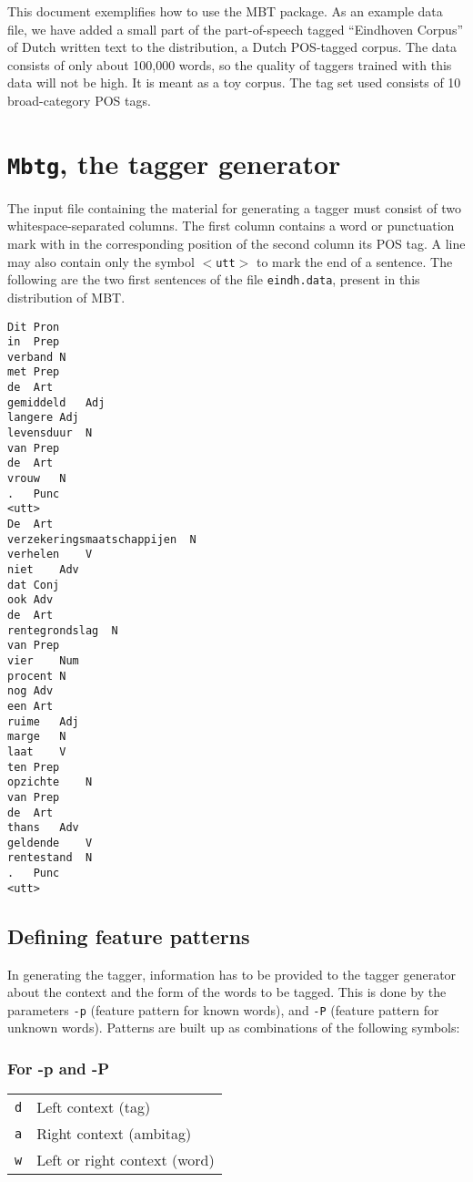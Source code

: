 \documentclass{report}
\begin{document}
This document exemplifies how to use the MBT package. As an example
data file, we have added a small part of the part-of-speech tagged
``Eindhoven Corpus'' of Dutch written text \cite{Uitdenboogaard75} to
the distribution, a Dutch POS-tagged corpus. The data consists of only
about 100,000 words, so the quality of taggers trained with this data
will not be high. It is meant as a toy corpus. The tag set used
consists of 10 broad-category POS tags.

\section{{\tt Mbtg}, the tagger generator}

The input file containing the material for generating a tagger must
consist of two whitespace-separated columns. The first column contains
a word or punctuation mark with in the corresponding position of the
second column its POS tag. A line may also contain only the symbol
{\tt $<$utt$>$} to mark the end of a sentence. The following are the two first
sentences of the file {\tt eindh.data}, present in this distribution
of MBT.

{\footnotesize
\begin{verbatim}
Dit	Pron
in	Prep
verband	N
met	Prep
de	Art
gemiddeld	Adj
langere	Adj
levensduur	N
van	Prep
de	Art
vrouw	N
.	Punc
<utt>
De	Art
verzekeringsmaatschappijen	N
verhelen	V
niet	Adv
dat	Conj
ook	Adv
de	Art
rentegrondslag	N
van	Prep
vier	Num
procent	N
nog	Adv
een	Art
ruime	Adj
marge	N
laat	V
ten	Prep
opzichte	N
van	Prep
de	Art
thans	Adv
geldende	V
rentestand	N
.	Punc
<utt>
\end{verbatim}
}


\subsection{Defining feature patterns}

In generating the tagger, information has to be provided to the
tagger generator about the context and the form of the words to be
tagged. This is done by the parameters {\tt -p} (feature pattern for known
words), and {\tt -P} (feature pattern for unknown words). Patterns are
built up as combinations of the following symbols:

\subsubsection*{For -p and -P}

\begin{tabular}{ll}
{\tt d} & Left context (tag)\\
{\tt a} & Right context (ambitag)\\
{\tt w} & Left or right context (word)\\
\end{tabular}
\end{document}
